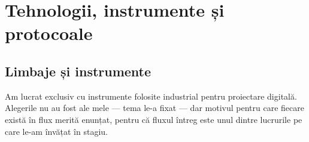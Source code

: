 \documentclass[11pt,openany]{report}
\begin{document}
\appendix
\chapter{Tehnologii, instrumente și protocoale}
\label{ch:tehnologii}

\section{Limbaje și instrumente}

Am lucrat exclusiv cu instrumente folosite industrial pentru proiectare
digitală. Alegerile nu au fost ale mele --- tema le-a fixat --- dar motivul
pentru care fiecare există în flux merită enunțat, pentru că fluxul întreg este
unul dintre lucrurile pe care le-am învățat în stagiu.
\end{document}
